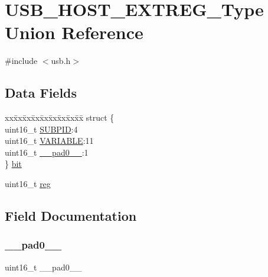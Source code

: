 \hypertarget{union_u_s_b___h_o_s_t___e_x_t_r_e_g___type}{}\section{U\+S\+B\+\_\+\+H\+O\+S\+T\+\_\+\+E\+X\+T\+R\+E\+G\+\_\+\+Type Union Reference}
\label{union_u_s_b___h_o_s_t___e_x_t_r_e_g___type}


{\ttfamily \#include $<$usb.\+h$>$}

\subsection*{Data Fields}
\begin{DoxyCompactItemize}
\item 
\begin{tabbing}
xx\=xx\=xx\=xx\=xx\=xx\=xx\=xx\=xx\=\kill
struct \{\\
\>uint16\_t \mbox{\hyperlink{union_u_s_b___h_o_s_t___e_x_t_r_e_g___type_afd031d1cb3ff27616a046fd5bc5b8d0c}{SUBPID}}:4\\
\>uint16\_t \mbox{\hyperlink{union_u_s_b___h_o_s_t___e_x_t_r_e_g___type_a93176bd4b468edc2704474a2aa255b5f}{VARIABLE}}:11\\
\>uint16\_t \mbox{\hyperlink{union_u_s_b___h_o_s_t___e_x_t_r_e_g___type_a77132c2c26a75f5b8751b235cda23828}{\_\_pad0\_\_}}:1\\
\} \mbox{\hyperlink{union_u_s_b___h_o_s_t___e_x_t_r_e_g___type_a92698769c2d42fb5decb65725bed0fbd}{bit}}\\

\end{tabbing}\item 
uint16\+\_\+t \mbox{\hyperlink{union_u_s_b___h_o_s_t___e_x_t_r_e_g___type_a11760f5020019f4aa8cb02e694f7cc44}{reg}}
\end{DoxyCompactItemize}


\subsection{Field Documentation}
\mbox{\label{union_u_s_b___h_o_s_t___e_x_t_r_e_g___type_a77132c2c26a75f5b8751b235cda23828}} 
\subsubsection{\texorpdfstring{\_\_pad0\_\_}{\_\_pad0\_\_}}
{\footnotesize\ttfamily uint16\+\_\+t \+\_\+\+\_\+pad0\+\_\+\+\_\+}

